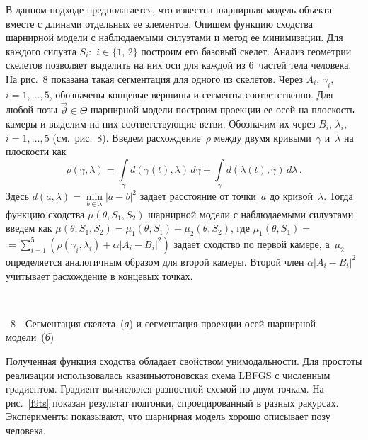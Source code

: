 \begin{multicols}{2}
     В данном подходе предполагается, что известна шарнирная модель 
объекта вместе с длинами отдельных ее элементов. Опишем функцию сходства 
шарнирной модели с наблюдаемыми силуэтами и метод ее минимизации. Для 
каждого силуэта $S_i$:~$i\in \{1,\,2\}$ построим его базовый скелет. Анализ 
геометрии скелетов позволяет выделить на них оси для каждой из 6~частей 
тела человека. На рис.~8 показана такая сегментация для одного из 
скелетов. Через $A_i$, $\gamma_i$, $i=1,\ldots , 5$, обозначены концевые 
вершины и сегменты соответственно. Для любой позы $\vec\vartheta\in\Theta$ 
шарнирной модели построим проекции ее осей на плоскость камеры и выделим 
на них соответствующие ветви. Обозначим их через $B_i$, $\lambda_i$,  $i = 1, 
\ldots , 5$ (см.\ рис.~8). Введем расхождение~$\rho$ между двумя 
кривыми~$\gamma$ и~$\lambda$ на плоскости как
     $$
     \rho(\gamma , \lambda ) =\int\limits_{\gamma} 
d(\gamma(t),\lambda)\,d\gamma+\int\limits_\gamma 
d(\lambda(t),\gamma)\,d\lambda\,.
     $$
Здесь $d(a,\lambda)=\underset{b\in\lambda}{\min} \vert a-b\vert^2$ задает 
расстояние от точки~$a$ до кривой~$\lambda$. Тогда функцию сходства 
$\mu(\theta , S_1, S_2)$ шарнирной модели с наблюдаемыми силуэтами введем 
как $\mu(\theta ,S_1, S_2) =\mu_1(\theta, S_1)+\mu_2(\theta ,S_2)$, где 
$\mu_1(\theta,S_1)=$\linebreak $=\sum\limits_{i=1}^5\left(\rho(\gamma_i,\lambda_i)+\alpha \vert 
A_i-B_i\vert^2\right)$ задает сходство по первой камере, а~$\mu_2$ 
определяется аналогичным образом для второй камеры. Второй член 
$\alpha\vert A_i-B_i\vert^2$ учитывает расхождение в концевых точках. 

\noindent
\begin{center} %
\vspace*{12pt}
\mbox{%
\epsfxsize=79.684mm
}
\end{center}
\vspace*{3pt}
{{\figurename~8}\ \ \small{Сегментация скелета~(\textit{а}) и сегментация проекции осей шарнирной 
модели~(\textit{б})}}
\vspace*{3pt}

\bigskip
\addtocounter{figure}{1}

     
     Полученная функция сходства обладает свойством унимодальности. Для 
простоты реализации использовалась квазиньютоновская схема LBFGS с 
численным градиентом. Градиент вычислялся разностной схемой по двум 
точкам. На рис.~\ref{f9ts} показан результат подгонки, спроецированный в 
разных ракурсах. Эксперименты показывают, что шарнирная модель хорошо 
описывает позу человека.


\end{multicols}

